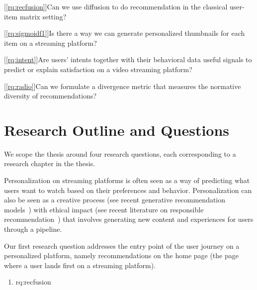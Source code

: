 
[\ref{rq:recfusion}]{Can we use diffusion to do recommendation in the classical user-item matrix setting?}

[\ref{rq:sigmoidf1}]{Is there a way we can generate personalized thumbnails for each item on a streaming platform?}

[\ref{rq:intent}]{Are users' intents together with their behavioral data useful signals to predict or explain satisfaction on a video streaming platform?}

[\ref{rq:radio}]{Can we formulate a divergence metric that measures the normative diversity of recommendations?}

\section{Research Outline and Questions}
\label{section:introduction:rqs}


We scope the thesis around four research questions, each corresponding to a research chapter in the thesis.


Personalization on streaming platforms is often seen as a way of predicting what users want to watch based on their preferences and behavior. Personalization can also be seen as a creative process (see recent generative recommendation models~\cite{llmRecNews, llmRec, genirRec}) with ethical impact (see recent literature on responsible recommendation~\cite{helberger, normalize, fairChatGPTReco}) that involves generating new content and experiences for users through a pipeline.

\noindent {}

Our first research question addresses the entry point of the user journey on a personalized platform, namely recommendations on the home page (the page where a user lands first on a streaming platform).
%
\begin{enumerate}[label=\textbf{RQ\arabic*},ref={RQ\arabic*},resume,leftmargin=*]
	\item \acl{rq:recfusion}\label{rq:recfusion}
\end{enumerate}
%



